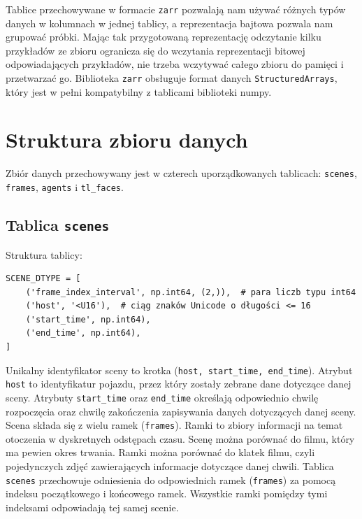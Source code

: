 \vspace{1em}

Tablice przechowywane w formacie \texttt{zarr} pozwalają nam używać różnych typów danych w kolumnach w jednej tablicy, a reprezentacja bajtowa pozwala nam grupować próbki. Mając tak przygotowaną reprezentację odczytanie kilku przykładów ze zbioru ogranicza się do wczytania reprezentacji bitowej odpowiadających przykładów, nie trzeba wczytywać całego zbioru do pamięci i przetwarzać go. Biblioteka \texttt{zarr} obsługuje format danych \texttt{StructuredArrays}, który jest w pełni kompatybilny z tablicami biblioteki numpy.

\vspace{1em}

\section{Struktura zbioru danych}

Zbiór danych przechowywany jest w czterech uporządkowanych tablicach: \texttt{scenes}, \texttt{frames}, \texttt{agents} i \texttt{tl\_faces}.

\subsection{Tablica \texttt{scenes}}

\noindent
Struktura tablicy:

\begin{verbatim}
SCENE_DTYPE = [
    ('frame_index_interval', np.int64, (2,)),  # para liczb typu int64
    ('host', '<U16'),  # ciąg znaków Unicode o długości <= 16
    ('start_time', np.int64),
    ('end_time', np.int64),
]
\end{verbatim}

\noindent
Unikalny identyfikator sceny to krotka (\texttt{host, start\_time, end\_time}).
Atrybut \texttt{host} to identyfikatur pojazdu, przez który zostały zebrane dane dotyczące danej sceny. Atrybuty \texttt{start\_time} oraz \texttt{end\_time} określają odpowiednio chwilę rozpoczęcia oraz chwilę zakończenia zapisywania danych dotyczących danej sceny. Scena składa się z wielu ramek (\texttt{frames}). Ramki to zbiory informacji na temat otoczenia w dyskretnych odstępach czasu. Scenę można porównać do filmu, który ma pewien okres trwania. Ramki można porównać do klatek filmu, czyli pojedynczych zdjęć zawierających informacje dotyczące danej chwili. Tablica \texttt{scenes} przechowuje odniesienia do odpowiednich ramek (\texttt{frames}) za pomocą indeksu początkowego i końcowego ramek. Wszystkie ramki pomiędzy tymi indeksami odpowiadają tej samej scenie.

